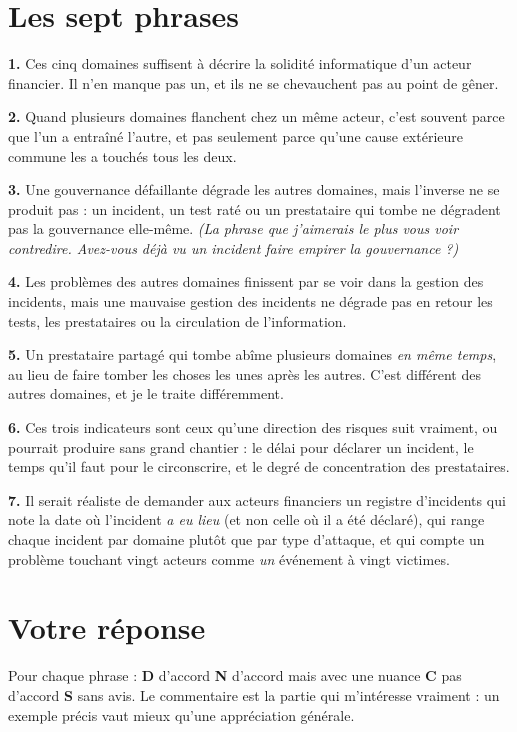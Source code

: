 \documentclass[11pt,a4paper]{article}
\begin{document}
\section*{Les sept phrases}

\textbf{1.} Ces cinq domaines suffisent à décrire la solidité informatique d'un acteur financier.
Il n'en manque pas un, et ils ne se chevauchent pas au point de gêner.

\textbf{2.} Quand plusieurs domaines flanchent chez un même acteur, c'est souvent parce que l'un
a entraîné l'autre, et pas seulement parce qu'une cause extérieure commune les a touchés tous les
deux.

\textbf{3.} Une gouvernance défaillante dégrade les autres domaines, mais l'inverse ne se produit
pas : un incident, un test raté ou un prestataire qui tombe ne dégradent pas la gouvernance
elle-même. \emph{(La phrase que j'aimerais le plus vous voir contredire. Avez-vous déjà vu un
incident faire empirer la gouvernance ?)}

\textbf{4.} Les problèmes des autres domaines finissent par se voir dans la gestion des
incidents, mais une mauvaise gestion des incidents ne dégrade pas en retour les tests, les
prestataires ou la circulation de l'information.

\textbf{5.} Un prestataire partagé qui tombe abîme plusieurs domaines \emph{en même temps}, au
lieu de faire tomber les choses les unes après les autres. C'est différent des autres domaines, et
je le traite différemment.

\textbf{6.} Ces trois indicateurs sont ceux qu'une direction des risques suit vraiment, ou
pourrait produire sans grand chantier : le délai pour déclarer un incident, le temps qu'il faut
pour le circonscrire, et le degré de concentration des prestataires.

\textbf{7.} Il serait réaliste de demander aux acteurs financiers un registre d'incidents qui
note la date où l'incident \emph{a eu lieu} (et non celle où il a été déclaré), qui range chaque
incident par domaine plutôt que par type d'attaque, et qui compte un problème touchant vingt
acteurs comme \emph{un} événement à vingt victimes.

\section*{Votre réponse}

Pour chaque phrase : \textbf{D} d'accord \textbullet{} \textbf{N} d'accord mais avec une nuance
\textbullet{} \textbf{C} pas d'accord \textbullet{} \textbf{S} sans avis. Le commentaire est la
partie qui m'intéresse vraiment : un exemple précis vaut mieux qu'une appréciation générale.
\end{document}
